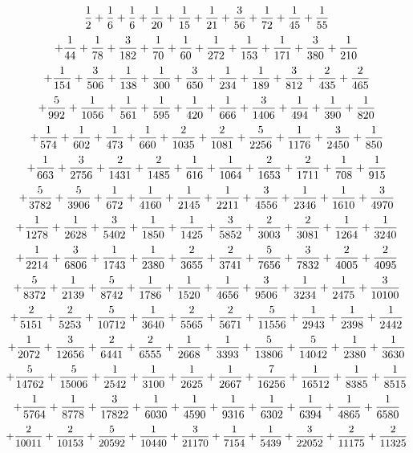 \documentclass{article}
\begin{document}
$$ {1\over 2}  +  {1\over 6}  +  {1\over 6}  +  {1\over 20}  +  {1\over 15}  +  {1\over 21}  +  {3\over 56}  +  {1\over 72}  +  {1\over 45}  +  {1\over 55}  $$
$$+  {1\over 44}  +  {1\over 78}  +  {3\over 182}  +  {1\over 70}  +  {1\over 60}  +  {1\over 272}  +  {1\over 153}  +  {1\over 171}  +  {3\over 380}  +  {1\over 210}  $$
$$+  {1\over 154}  +  {3\over 506}  +  {1\over 138}  +  {1\over 300}  +  {3\over 650}  +  {1\over 234}  +  {1\over 189}  +  {3\over 812}  +  {2\over 435}  +  {2\over 465}  $$
$$+  {5\over 992}  +  {1\over 1056}  +  {1\over 561}  +  {1\over 595}  +  {1\over 420}  +  {1\over 666}  +  {3\over 1406}  +  {1\over 494}  +  {1\over 390}  +  {1\over 820}  $$
$$+  {1\over 574}  +  {1\over 602}  +  {1\over 473}  +  {1\over 660}  +  {2\over 1035}  +  {2\over 1081}  +  {5\over 2256}  +  {1\over 1176}  +  {3\over 2450}  +  {1\over 850}  $$
$$+  {1\over 663}  +  {3\over 2756}  +  {2\over 1431}  +  {2\over 1485}  +  {1\over 616}  +  {1\over 1064}  +  {2\over 1653}  +  {2\over 1711}  +  {1\over 708}  +  {1\over 915}  $$
$$+  {5\over 3782}  +  {5\over 3906}  +  {1\over 672}  +  {1\over 4160}  +  {1\over 2145}  +  {1\over 2211}  +  {3\over 4556}  +  {1\over 2346}  +  {1\over 1610}  +  {3\over 4970}  $$
$$+  {1\over 1278}  +  {1\over 2628}  +  {3\over 5402}  +  {1\over 1850}  +  {1\over 1425}  +  {3\over 5852}  +  {2\over 3003}  +  {2\over 3081}  +  {1\over 1264}  +  {1\over 3240}  $$
$$+  {1\over 2214}  +  {3\over 6806}  +  {1\over 1743}  +  {1\over 2380}  +  {2\over 3655}  +  {2\over 3741}  +  {5\over 7656}  +  {3\over 7832}  +  {2\over 4005}  +  {2\over 4095}  $$
$$+  {5\over 8372}  +  {1\over 2139}  +  {5\over 8742}  +  {1\over 1786}  +  {1\over 1520}  +  {1\over 4656}  +  {3\over 9506}  +  {1\over 3234}  +  {1\over 2475}  +  {3\over 10100}  $$
$$+  {2\over 5151}  +  {2\over 5253}  +  {5\over 10712}  +  {1\over 3640}  +  {2\over 5565}  +  {2\over 5671}  +  {5\over 11556}  +  {1\over 2943}  +  {1\over 2398}  +  {1\over 2442}  $$
$$+  {1\over 2072}  +  {3\over 12656}  +  {2\over 6441}  +  {2\over 6555}  +  {1\over 2668}  +  {1\over 3393}  +  {5\over 13806}  +  {5\over 14042}  +  {1\over 2380}  +  {1\over 3630}  $$
$$+  {5\over 14762}  +  {5\over 15006}  +  {1\over 2542}  +  {1\over 3100}  +  {1\over 2625}  +  {1\over 2667}  +  {7\over 16256}  +  {1\over 16512}  +  {1\over 8385}  +  {1\over 8515}  $$
$$+  {1\over 5764}  +  {1\over 8778}  +  {3\over 17822}  +  {1\over 6030}  +  {1\over 4590}  +  {1\over 9316}  +  {1\over 6302}  +  {1\over 6394}  +  {1\over 4865}  +  {1\over 6580}  $$
$$+  {2\over 10011}  +  {2\over 10153}  +  {5\over 20592}  +  {1\over 10440}  +  {3\over 21170}  +  {1\over 7154}  +  {1\over 5439}  +  {3\over 22052}  +  {2\over 11175}  +  {2\over 11325}  $$
\end{document}
